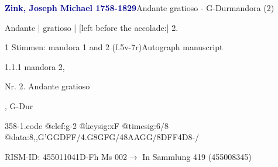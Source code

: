 \documentclass[twocolumn]{book}
\begin{document}
\par \vspace{7pt} \textcolor{darkblue}{\textbf{Zink, Joseph Michael  1758-1829}}\hfillplus{\textbf{[358]}}\newline Andante gratioso - G-Dur\newline mandora (2)
\par \begin{itshape} Andante | gratioso | [left before the accolade:] 2.\end{itshape} 
\par \textcolor{darkblue}{}  1 Stimmen: mandora 1 and 2  (f.5v-7r)\newline Autograph manuscript
\par 1.1.1  mandora 2, \begin{itshape}Nr. 2. Andante gratioso\end{itshape}, G-Dur  
\begin{filecontents*}{358-1.code}
@clef:g-2
@keysig:xF
@timesig:6/8
@data:8,,G'GGDFF/4.G8GFG/48AAGG/8DFF4D8-/
\end{filecontents*}
\newline
%
\par RISM-ID: 455011041\newline D-Fh  Ms 002\newline $\rightarrow$ In Sammlung 419 (455008345)
      
\end{document}

